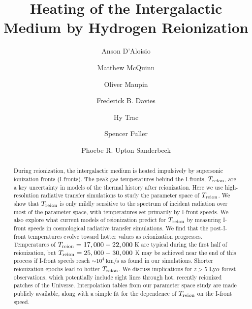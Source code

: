 \documentclass[twocolumn]{aastex62}
\newcommand{\Treion}{T_{\rm reion}}
\begin{document}
\title{Heating of the Intergalactic Medium by Hydrogen Reionization}

\author{Anson D'Aloisio}

\author{Matthew McQuinn}

\author{Oliver Maupin}

\author{Frederick B. Davies}

\author{Hy Trac}

\author{Spencer Fuller}

\author{Phoebe R. Upton Sanderbeck}

\begin{abstract}
During reionization, the intergalactic medium is heated impulsively by supersonic ionization fronts (I-fronts).  The peak gas temperatures behind the I-fronts, $\Treion$, are a key uncertainty in models of the thermal history after reionization.  Here we use high-resolution radiative transfer simulations to study the parameter space of $\Treion$.  We show that $\Treion$ is only mildly sensitive to the spectrum of incident radiation over most of the parameter space, with temperatures set primarily by I-front speeds.  We also explore what current models of reionization predict for $\Treion$ by measuring I-front speeds in cosmological radiative transfer simulations.  We find that the post-I-front temperatures evolve toward hotter values as reionization progresses.  Temperatures of $\Treion = 17,000-22,000$ K are typical during the first half of reionization, but $\Treion = 25,000 - 30,000$ K may be achieved near the end of this process if I-front speeds reach $\sim10^4~\mathrm{km/s}$ as found in our simulations.  Shorter reionization epochs lead to hotter $\Treion$.  We discuss implications for $z>5$ Ly$\alpha$ forest observations, which potentially include sight lines through hot, recently reionized patches of the Universe.  Interpolation tables from our parameter space study are made publicly available, along with a simple fit for the dependence of $\Treion$ on the I-front speed.        
\end{abstract}
\end{document}
